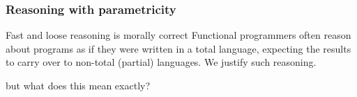 \begin{frame}[fragile]
\frametitle{Reasoning with parametricity}
\begin{block}{Fast and loose reasoning is morally correct \cite{danielsson2006fast}}
\small{Functional programmers often reason about programs as if
they were written in a total language, expecting the results
to carry over to non-total (partial) languages. We justify
such reasoning.}
\end{block}
but what does this mean exactly?
\end{frame}

